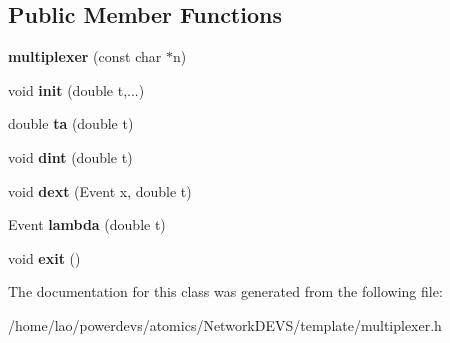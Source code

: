 \subsection*{Public Member Functions}
\begin{DoxyCompactItemize}
\item 
{\bfseries multiplexer} (const char $\ast$n)\hypertarget{classmultiplexer_ad773958bed4b562944c5aa64b51c12e2}{}\label{classmultiplexer_ad773958bed4b562944c5aa64b51c12e2}

\item 
void {\bfseries init} (double t,...)\hypertarget{classmultiplexer_a89d1c7d0d014b6341342bb115b629b39}{}\label{classmultiplexer_a89d1c7d0d014b6341342bb115b629b39}

\item 
double {\bfseries ta} (double t)\hypertarget{classmultiplexer_aad0217a5272cb0ddedbe8f0f09cc848e}{}\label{classmultiplexer_aad0217a5272cb0ddedbe8f0f09cc848e}

\item 
void {\bfseries dint} (double t)\hypertarget{classmultiplexer_a79ad103daf7edca1b9a531cf5357454d}{}\label{classmultiplexer_a79ad103daf7edca1b9a531cf5357454d}

\item 
void {\bfseries dext} (Event x, double t)\hypertarget{classmultiplexer_ab4e33e3c6ee03872ced6d8f74c59d3b5}{}\label{classmultiplexer_ab4e33e3c6ee03872ced6d8f74c59d3b5}

\item 
Event {\bfseries lambda} (double t)\hypertarget{classmultiplexer_ac40185474d904e50800239c9fa12ccbb}{}\label{classmultiplexer_ac40185474d904e50800239c9fa12ccbb}

\item 
void {\bfseries exit} ()\hypertarget{classmultiplexer_afe429c64e63b74d16ec39fb1292b971a}{}\label{classmultiplexer_afe429c64e63b74d16ec39fb1292b971a}

\end{DoxyCompactItemize}


The documentation for this class was generated from the following file\+:\begin{DoxyCompactItemize}
\item 
/home/lao/powerdevs/atomics/\+Network\+D\+E\+V\+S/template/multiplexer.\+h\end{DoxyCompactItemize}
